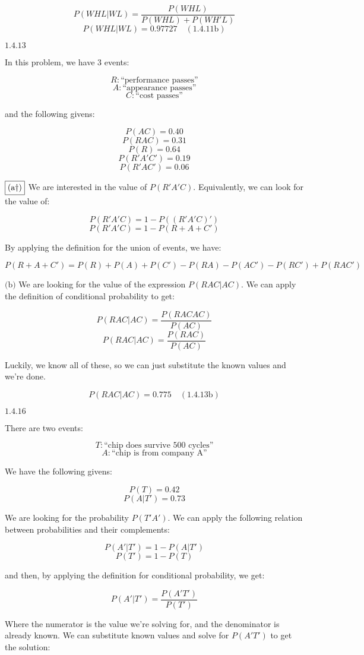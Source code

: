 \documentclass{article}
\newcommand{\problem}[2]{$\boxed{\text{#1.#2}}$}
\newcommand{\subproblem}[3]{$\boxed{\text{(#3)}}$}
\newcommand{\subsolution}[4]{\boxed{#4\quad(\text{#1.#2#3})}}
\begin{document}
\[
P(WHL|WL)=\dfrac{P(WHL)}{P(WHL)+P(WH'L)}
\] \[
\subsolution{1.4}{11}{b}{P(WHL|WL)=0.97727}
\]

%
\problem{1.4}{13}

In this problem, we have 3 events:

\[
R:\text{``performance passes''}
\] \[
A:\text{``appearance passes''}
\] \[
C:\text{``cost passes''}
\]

and the following givens:

\[
P(AC)=0.40
\] \[
P(RAC)=0.31
\] \[
P(R)=0.64
\] \[
P(R'A'C')=0.19
\] \[
P(R'AC')=0.06
\]

%
\subproblem{1.4}{13}{a\dag} We are interested in the value of
$P(R'A'C)$. Equivalently, we can look for the value of:

\[
P(R'A'C)=1-P((R'A'C)')
\] \[
P(R'A'C)=1-P(R+A+C')
\]

By applying the definition for the union of events, we have:

\[
P(R+A+C')=P(R)+P(A)+P(C')-P(RA)-P(AC')-P(RC')+P(RAC')
\]

%
\subproblem{1.4}{13}{b} We are looking for the value of the expression
$P(RAC|AC)$. We can apply the definition of conditional probability to
get:

\[
P(RAC|AC)=\dfrac{P(RACAC)}{P(AC)}
\] \[
P(RAC|AC)=\dfrac{P(RAC)}{P(AC)}
\]

Luckily, we know all of these, so we can just substitute the known
values and we're done.

\[
\subsolution{1.4}{13}{b}{P(RAC|AC)=0.775}
\]

%
\problem{1.4}{16}

There are two events:

\[
T:\text{``chip does survive 500 cycles''}
\] \[
A:\text{``chip is from company A''}
\]

We have the following givens:

\[
P(T)=0.42
\] \[
P(A|T')=0.73
\]

We are looking for the probability $P(T'A')$. We can apply the
following relation between probabilities and their complements:

\[
P(A'|T')=1-P(A|T')
\] \[
P(T')=1-P(T)
\]

and then, by applying the definition for conditional probability, we
get:

\[
P(A'|T')=\dfrac{P(A'T')}{P(T')}
\]

Where the numerator is the value we're solving for, and the
denominator is already known. We can substitute known values and solve
for $P(A'T')$ to get the solution:
\end{document}
